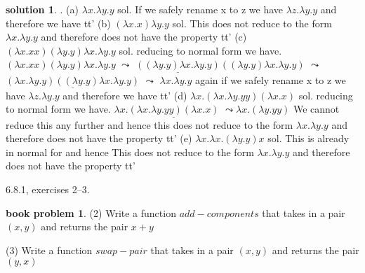 \documentclass[10pt]{article}
\theoremstyle{definition}
\newtheorem{bp}{book problem}
\newtheorem{sol}{solution}
\begin{document}
\begin{sol}.\newline
	(a) $\lambda x. \lambda y.y$ \newline
	sol. If we safely rename x to z we have $\lambda z. \lambda y.y$ and therefore we have t\textdownarrow t' \newline
	(b) $(\lambda x.x) \lambda y.y$ \newline
	sol. This does not reduce to the form $\lambda x.\lambda y.y$ and therefore does not have the property t\textdownarrow t' \newline
	(c) $( \lambda x.x x)( \lambda y.y) \lambda x. \lambda y.y$ \newline
	sol. reducing to normal form we have. \newline
	\underline{$( \lambda x.x x)( \lambda y.y) \lambda x. \lambda y.y$} \newline
	$\leadsto$ $\underline{(( \lambda y.y) \lambda x. \lambda y.y)}(( \lambda y.y) \lambda x. \lambda y.y)$ \newline
	$\leadsto$ $\underline{(\lambda x. \lambda y.y)(( \lambda y.y) \lambda x. \lambda y.y)}$ \newline
	$\leadsto$ $\lambda x. \lambda y.y$ \newline
	again if we safely rename x to z we have $\lambda z. \lambda y.y$ and therefore we have t\textdownarrow t'
	(d) $ \lambda x.( \lambda x. \lambda y.y y)( \lambda x.x)$ \newline
	sol. reducing to normal form we have. \newline
	$ \lambda x.\underline{( \lambda x. \lambda y.y y)( \lambda x.x)}$ \newline
	$\leadsto \lambda x.(\lambda y.y y)$ \newline
	We cannot reduce this any further and hence this does not reduce to the form $\lambda x.\lambda y.y$ and therefore does not have the property t\textdownarrow t' \newline
	(e) $ \lambda x.\lambda x.(\lambda y.y)x$ \newline
	sol. This is already in normal for and hence  This does not reduce to the form $\lambda x.\lambda y.y$ and therefore does not have the property t\textdownarrow t' \newline


\end{sol}

6.8.1, exercises 2--3.

\begin{bp}

	(2) Write a function $add-components$ that takes in a pair $(x,y)$ and returns the pair $x + y$

	(3) Write a function $swap-pair$ that takes in a pair $(x,y)$ and returns the pair $(y,x)$

\end{bp}
\end{document}
